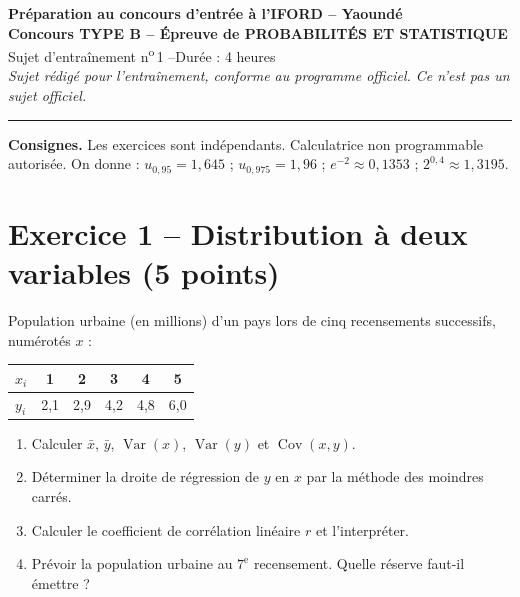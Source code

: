\documentclass[11pt,a4paper]{article}
\begin{document}
\begin{center}
{\large\bfseries Préparation au concours d'entrée à l'IFORD -- Yaoundé}\\[2mm]
{\Large\bfseries Concours TYPE B -- Épreuve de PROBABILITÉS ET STATISTIQUE}\\[2mm]
Sujet d'entraînement n\textsuperscript{o}\,1 \quad --\quad Durée : 4 heures\\[1mm]
\emph{Sujet rédigé pour l'entraînement, conforme au programme officiel. Ce n'est pas un sujet officiel.}
\end{center}
\hrule\medskip

\noindent\textbf{Consignes.} Les exercices sont indépendants. Calculatrice non programmable autorisée.
On donne : $u_{0{,}95} = 1{,}645$ ; $u_{0{,}975} = 1{,}96$ ; $e^{-2} \approx 0{,}1353$ ; $2^{0{,}4} \approx 1{,}3195$.

\section*{Exercice 1 -- Distribution à deux variables (5 points)}
Population urbaine (en millions) d'un pays lors de cinq recensements successifs, numérotés $x$ :
\begin{center}
\begin{tabular}{lccccc}
\toprule
$x_i$ & 1 & 2 & 3 & 4 & 5\\ \midrule
$y_i$ & 2{,}1 & 2{,}9 & 4{,}2 & 4{,}8 & 6{,}0\\ \bottomrule
\end{tabular}
\end{center}
\begin{enumerate}
  \item Calculer $\bar{x}$, $\bar{y}$, $\operatorname{Var}(x)$, $\operatorname{Var}(y)$ et $\operatorname{Cov}(x,y)$.
  \item Déterminer la droite de régression de $y$ en $x$ par la méthode des moindres carrés.
  \item Calculer le coefficient de corrélation linéaire $r$ et l'interpréter.
  \item Prévoir la population urbaine au $7^{\text{e}}$ recensement. Quelle réserve faut-il émettre ?
\end{enumerate}
\end{document}
